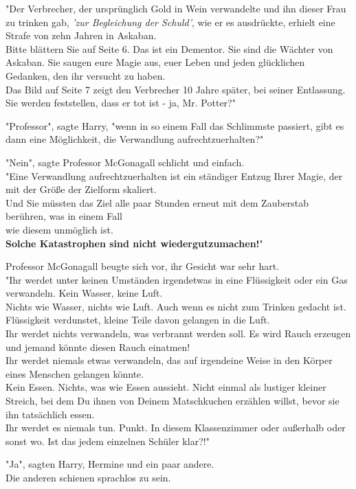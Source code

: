 {"Der Verbrecher, der ursprünglich Gold in Wein verwandelte und ihn dieser Frau zu trinken gab, \emph{'zur Begleichung der Schuld'}, wie er es ausdrückte, erhielt eine Strafe von zehn Jahren in Askaban.\\ Bitte blättern Sie auf Seite 6. Das ist ein Dementor. Sie sind die Wächter von Askaban. Sie saugen eure Magie aus, euer Leben und jeden glücklichen Gedanken, den ihr versucht zu haben.\\ Das Bild auf Seite 7 zeigt den Verbrecher 10 Jahre später, bei seiner Entlassung. Sie werden feststellen, dass er tot ist - ja, Mr. Potter?"

"Professor", sagte Harry, "wenn in so einem Fall das Schlimmste passiert, gibt es dann eine Möglichkeit, die Verwandlung aufrechtzuerhalten?"

"Nein", sagte Professor McGonagall schlicht und einfach.\\ "Eine Verwandlung aufrechtzuerhalten ist ein ständiger Entzug Ihrer Magie, der mit der Größe der Zielform skaliert.\\ Und Sie müssten das Ziel alle paar Stunden erneut mit dem Zauberstab berühren, was in einem Fall\\ wie diesem unmöglich ist.\\ \textbf{Solche Katastrophen sind nicht wiedergutzumachen!}"

Professor McGonagall beugte sich vor, ihr Gesicht war sehr hart.\\ "Ihr werdet unter keinen Umständen irgendetwas in eine Flüssigkeit oder ein Gas verwandeln. Kein Wasser, keine Luft.\\ Nichts wie Wasser, nichts wie Luft. Auch wenn es nicht zum Trinken gedacht ist. Flüssigkeit verdunstet, kleine Teile davon gelangen in die Luft.\\ Ihr werdet nichts verwandeln, was verbrannt werden soll. Es wird Rauch erzeugen und jemand könnte diesen Rauch einatmen!\\ Ihr werdet niemals etwas verwandeln, das auf irgendeine Weise in den Körper eines Menschen gelangen könnte.\\ Kein Essen. Nichts, was wie Essen aussieht. Nicht einmal als lustiger kleiner Streich, bei dem Du ihnen von Deinem Matschkuchen erzählen willst, bevor sie ihn tatsächlich essen.\\ Ihr werdet es niemals tun. Punkt. In diesem Klassenzimmer oder außerhalb oder sonst wo. Ist das jedem einzelnen Schüler klar?!"

"Ja", sagten Harry, Hermine und ein paar andere.\\ Die anderen schienen sprachlos zu sein.

}
